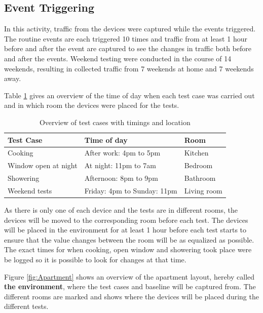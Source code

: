 \subsection{Event Triggering}
In this activity, traffic from the devices were captured while the events triggered. The routine events are each triggered 10 times and traffic from at least 1 hour before and after the event are captured to see the changes in traffic both before and after the events. Weekend testing were conducted in the course of 14 weekends, resulting in collected traffic from 7 weekends at home and 7 weekends away. 

Table \ref{tab:TestCases} gives an overview of the time of day when each test case was carried out and in which room the devices were placed for the tests. 
\begin{table}[H]
    \centering
    \caption{Overview of test cases with timings and location}
    \begin{adjustbox}{width=1\textwidth}
    \begin{tabular}{| p{5cm} | p{5cm} | p{3cm} |} 
        \hline
        \textbf{Test Case} & \textbf{Time of day} & \textbf{Room} \\
        \hline
        Cooking & After work: 4pm to 5pm & Kitchen \\
        \hline
        Window open at night & At night: 11pm to 7am & Bedroom\\
        \hline
        Showering & Afternoon: 8pm to 9pm & Bathroom \\
        \hline
        Weekend tests & Friday: 4pm to Sunday: 11pm & Living room \\
        \hline
    \end{tabular}
    \end{adjustbox}
    \label{tab:TestCases}
\end{table}

As there is only one of each device and the tests are in different rooms, the devices will be moved to the corresponding room before each test. The devices will be placed in the environment for at least 1 hour before each test starts to ensure that the value changes between the room will be as equalized as possible. The exact times for when cooking, open window and showering took place were be logged so it is possible to look for changes at that time. 

Figure \ref{fig:Apartment} shows an overview of the apartment layout, hereby called \textbf{the environment}, where the test cases and baseline will be captured from. The different rooms are marked and shows where the devices will be placed during the different tests. 

